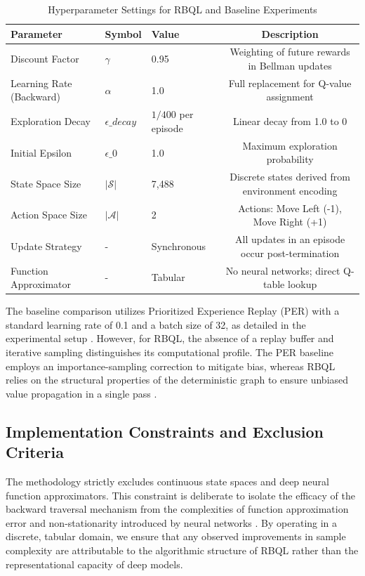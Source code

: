 \documentclass[manuscript, screen, review]{jair}
\begin{document}
\begin{table}[ht]
\caption{Hyperparameter Settings for RBQL and Baseline Experiments}
\label{tab:hyperparams}
\centering
\begin{tabular}{@{}lllc@{}}
\toprule
Parameter & Symbol & Value & Description \\
\midrule
Discount Factor & $\gamma$ & 0.95 & Weighting of future rewards in Bellman updates \\
Learning Rate (Backward) & $\alpha$ & 1.0 & Full replacement for Q-value assignment \\
Exploration Decay & $\epsilon\_{decay}$ & $1/400$ per episode & Linear decay from 1.0 to 0 \\
Initial Epsilon & $\epsilon\_0$ & 1.0 & Maximum exploration probability \\
State Space Size & $|\mathcal{S}|$ & 7,488 & Discrete states derived from environment encoding \\
Action Space Size & $|\mathcal{A}|$ & 2 & Actions: Move Left (-1), Move Right (+1) \\
Update Strategy & - & Synchronous & All updates in an episode occur post-termination \\
Function Approximator & - & Tabular & No neural networks; direct Q-table lookup \\
\bottomrule
\end{tabular}
\end{table}

The baseline comparison utilizes Prioritized Experience Replay (PER) with a standard learning rate of 0.1 and a batch size of 32, as detailed in the experimental setup \cite{Jin2021BellmanED}. However, for RBQL, the absence of a replay buffer and iterative sampling distinguishes its computational profile. The PER baseline employs an importance-sampling correction to mitigate bias, whereas RBQL relies on the structural properties of the deterministic graph to ensure unbiased value propagation in a single pass \cite{CarrascoDavis2025UncertaintyPE}.

\subsection{Implementation Constraints and Exclusion Criteria}

The methodology strictly excludes continuous state spaces and deep neural function approximators. This constraint is deliberate to isolate the efficacy of the backward traversal mechanism from the complexities of function approximation error and non-stationarity introduced by neural networks \cite{Gul2025TheRO}. By operating in a discrete, tabular domain, we ensure that any observed improvements in sample complexity are attributable to the algorithmic structure of RBQL rather than the representational capacity of deep models.
\end{document}
